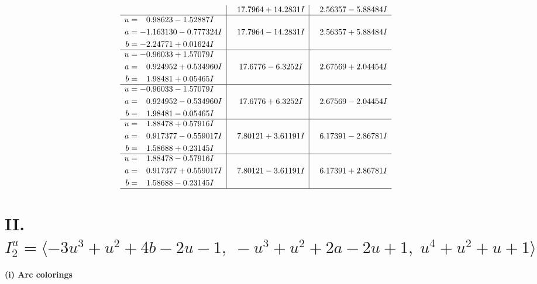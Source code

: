 \documentclass[1p]{elsarticle_modified}
\theoremstyle{definition}
\begin{document}
$$\begin{array}{c|c|c}
 & \phantom{-}17.7964 + 14.2831 I & \phantom{-}2.56357 - 5.88484 I \\ \hline\begin{aligned}
u &= \phantom{-}0.98623 - 1.52887 I \\
a &= -1.163130 - 0.777324 I \\
b &= -2.24771 + 0.01624 I\end{aligned}
 & \phantom{-}17.7964 - 14.2831 I & \phantom{-}2.56357 + 5.88484 I \\ \hline\begin{aligned}
u &= -0.96033 + 1.57079 I \\
a &= \phantom{-}0.924952 + 0.534960 I \\
b &= \phantom{-}1.98481 + 0.05465 I\end{aligned}
 & \phantom{-}17.6776 - 6.3252 I & \phantom{-}2.67569 + 2.04454 I \\ \hline\begin{aligned}
u &= -0.96033 - 1.57079 I \\
a &= \phantom{-}0.924952 - 0.534960 I \\
b &= \phantom{-}1.98481 - 0.05465 I\end{aligned}
 & \phantom{-}17.6776 + 6.3252 I & \phantom{-}2.67569 - 2.04454 I \\ \hline\begin{aligned}
u &= \phantom{-}1.88478 + 0.57916 I \\
a &= \phantom{-}0.917377 - 0.559017 I \\
b &= \phantom{-}1.58688 + 0.23145 I\end{aligned}
 & \phantom{-}7.80121 + 3.61191 I & \phantom{-}6.17391 - 2.86781 I \\ \hline\begin{aligned}
u &= \phantom{-}1.88478 - 0.57916 I \\
a &= \phantom{-}0.917377 + 0.559017 I \\
b &= \phantom{-}1.58688 - 0.23145 I\end{aligned}
 & \phantom{-}7.80121 - 3.61191 I & \phantom{-}6.17391 + 2.86781 I\\
 \hline 
 \end{array}$$\newpage\newpage\renewcommand{\arraystretch}{1}
\centering \section*{II. $I^u_{2}= \langle -3 u^3+u^2+4 b-2 u-1,\;- u^3+u^2+2 a-2 u+1,\;u^4+u^2+u+1 \rangle$}
\flushleft \textbf{(i) Arc colorings}\\
\end{document}
